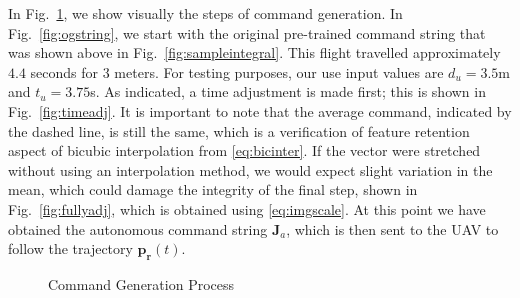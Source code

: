 \documentclass[letterpaper, 10 pt, conference]{ieeeconf}  %
\begin{document}
In Fig.~\ref{fig:gensample}, we show visually the steps of command generation. In Fig.~\ref{fig:ogstring}, we start with the original pre-trained command string that was shown above in Fig.~\ref{fig:sampleintegral}. This flight travelled approximately $4.4$ seconds for $3$ meters. For testing purposes, our use input values are $d_u=3.5$m and $t_u=3.75$s. As indicated, a time adjustment is made first; this is shown in Fig.~\ref{fig:timeadj}. It is important to note that the average command, indicated by the dashed line, is still the same, which is a verification of feature retention aspect of bicubic interpolation from \eqref{eq:bicinter}. If the vector were stretched without using an interpolation method, we would expect slight variation in the mean, which could damage the integrity of the final step, shown in Fig.~\ref{fig:fullyadj}, which is obtained using \eqref{eq:imgscale}. At this point we have obtained the autonomous command string $\mathbf{J}_a$, which is then sent to the UAV to follow the trajectory $\mathbf{p_r}(t)$.


\begin{figure}[h]
	\centering
	\caption{Command Generation Process}
	\label{fig:gensample}
\end{figure}
\end{document}
